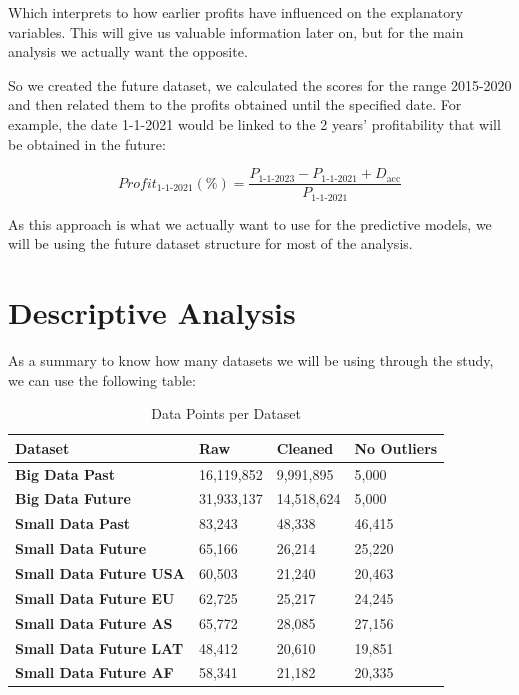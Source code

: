 \documentclass[11pt,english,a4paper,hidelinks]{book}
\begin{document}
\noindent Which interprets to how earlier profits have influenced on the explanatory variables. This will give us valuable information later on, but for the main analysis we actually want the opposite.

\vspace{0.5cm}
\noindent So we created the future dataset, we calculated the scores for the range 2015-2020 and then related them to the profits obtained until the specified date. For example, the date 1-1-2021 would be linked to the 2 years' profitability that will be obtained in the future: 

\begin{equation}
    Profit_{1\text{-}1\text{-}2021}(\%) = \frac{P_{1\text{-}1\text{-}2023} - P_{1\text{-}1\text{-}2021} + D_{\text{acc}}}{P_{1\text{-}1\text{-}2021}}
\end{equation}

\noindent As this approach is what we actually want to use for the predictive models, we will be using the future dataset structure for most of the analysis.

\section{Descriptive Analysis}

 As a summary to know how many datasets we will be using through the study, we can use the following table:

\begin{table}[H]
    \centering
    \begin{tabular}{|l|l|l|l|}
        \hline  
        \textbf{Dataset} & \textbf{Raw} & \textbf{Cleaned} & \textbf{No Outliers} \\
        \hline
        \textbf{Big Data Past} & 16,119,852 & 9,991,895 & 5,000 \\
        \hline
        \textbf{Big Data Future} & 31,933,137 & 14,518,624 & 5,000 \\
        \hline 
        \textbf{Small Data Past} & 83,243 & 48,338 & 46,415 \\
        \hline
        \textbf{Small Data Future} & 65,166 & 26,214 & 25,220 \\
        \hline
        \textbf{Small Data Future USA} & 60,503 & 21,240 & 20,463 \\
        \hline
        \textbf{Small Data Future EU} & 62,725 & 25,217 & 24,245 \\
        \hline        
        \textbf{Small Data Future AS} & 65,772 & 28,085 & 27,156\\
        \hline
        \textbf{Small Data Future LAT} & 48,412 & 20,610 & 19,851 \\
        \hline
        \textbf{Small Data Future AF} & 58,341 & 21,182 & 20,335 \\
        \hline
        \end{tabular}

    \caption{Data Points per Dataset}
    \label{tab:datasets_summary}
\end{table}
\end{document}
